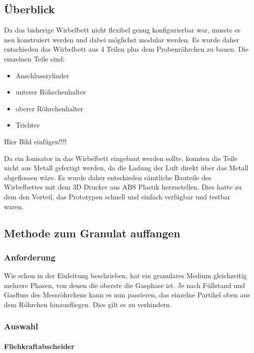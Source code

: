 \subsection{Überblick}

Da das bisherige Wirbelbett nicht flexibel genug konfigurierbar war, musste es neu konstruiert werden und dabei möglichst modular werden. Es wurde daher entschieden das Wirbelbett aus 4 Teilen plus dem Probenröhrchen zu bauen. Die einzelnen Teile sind:

\begin{itemize}
	\item Anschlusszylinder
	\item unterer Röhrchenhalter
	\item oberer Röhrchenhalter
	\item Trichter
\end{itemize}


Hier Bild einfügen!!!!


Da ein Ionisator in das Wirbelbett eingebaut werden sollte, konnten die Teile nicht aus Metall gefertigt werden, da die Ladung der Luft direkt über das Metall abgeflossen wäre. Es wurde daher entschieden sämtliche Bauteile des Wirbelbettes mit dem 3D Drucker aus ABS Plastik herzustellen. Dies hatte zu dem den Vorteil, das Prototypen schnell und einfach verfügbar und testbar waren. 


\subsection{Methode zum Granulat auffangen}

\subsubsection{Anforderung}

Wie schon in der Einleitung beschrieben, hat ein granulares Medium gleichzeitig mehrere Phasen, von denen die oberste die Gasphase ist. Je nach Füllstand und Gasfluss des Messröhrchens kann es nun passieren, das einzelne Partikel oben aus dem Röhrchen hinausfliegen. Dies gilt es zu verhindern.

\subsubsection{Auswahl}

\paragraph{Fliehkraftabscheider} 

